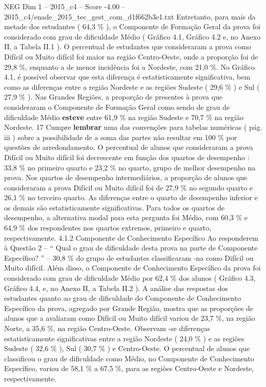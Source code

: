 \begin{textsample}{NEG Dim 1 – 2015\_c4 – Score -4.00 – 2015\_c4/enade\_2015\_tec\_gest\_com\_d1f662b3e1.txt}
Entretanto, para mais da metade dos estudantes ( 64,3 \% ), o Componente de Formação Geral da prova foi considerado com grau de dificuldade Médio ( Gráfico 4.1, Gráfico 4.2 e, no Anexo II, a Tabela II.1 ).
O percentual de estudantes que consideraram a prova como Difícil ou Muito difícil foi maior na região Centro-Oeste, onde a proporção foi de 29,8 \%, enquanto a de menor incidência foi a Nordeste, com 21,0 \%.
No Gráfico 4.1, é possível observar que esta diferença é estatisticamente significativa, bem como as diferenças entre a região Nordeste e as regiões Sudeste ( 29,6 \% ) e Sul ( 27,9 \% ).
Nas Grandes Regiões, a proporção de presentes à prova que consideraram o Componente de Formação Geral como sendo de grau de dificuldade Médio \textbf{esteve} entre 61,9 \% na região Sudeste e 70,7 \% na região Nordeste. 17 Cumpre \textbf{lembrar} uma das convenções para tabelas numéricas ( pág. iii ) sobre a possibilidade de a soma das partes não resultar em 100 \% por questões de arredondamento.
O percentual de alunos que consideraram a prova Difícil ou Muito difícil foi decrescente em função dos quartos de desempenho : 33,8 \% no primeiro quarto e 23,2 \% no quarto, grupo de melhor desempenho na prova.
Nos quartos de desempenho intermediários, a proporção de alunos que consideraram a prova Difícil ou Muito difícil foi de 27,9 \% no segundo quarto e 26,1 \% no terceiro quarto.
As diferenças entre o quarto de desempenho inferior e os demais são estatisticamente significativas.
Para todos os quartos de desempenho, a alternativa modal para esta pergunta foi Médio, com 60,3 \% e 64,9 \% dos respondentes nos quartos extremos, primeiro e quarto, respectivamente. 4.1.2 Componente de Conhecimento Específico Ao responderem à Questão 2 – “ Qual o grau de dificuldade desta prova na parte de Componente Específico? ” – 30,8 \% do grupo de estudantes classificaram -na como Difícil ou Muito difícil.
Além disso, o Componente de Conhecimento Específico da prova foi considerado com grau de dificuldade Médio por 62,4 \% dos alunos ( Gráfico 4.3, Gráfico 4.4, e, no Anexo II, a Tabela II.2 ).
A análise das respostas dos estudantes quanto ao grau de dificuldade do Componente de Conhecimento Específico da prova, agregado por Grande Região, mostra que as proporções de alunos que a avaliaram como Difícil ou Muito difícil variou de 23,7 \%, na região Norte, a 35,6 \%, na região Centro-Oeste.
Observam -se diferenças estatisticamente significativas entre a região Nordeste ( 24,0 \% ) e as regiões Sudeste ( 32,6 \% ), Sul ( 30,7 \% ) e Centro-Oeste.
O percentual de alunos que classificou o grau de dificuldade como Médio, no Componente de Conhecimento Específico, variou de 58,1 \% a 67,5 \%, para as regiões Centro-Oeste e Nordeste, respectivamente.

\end{textsample}
